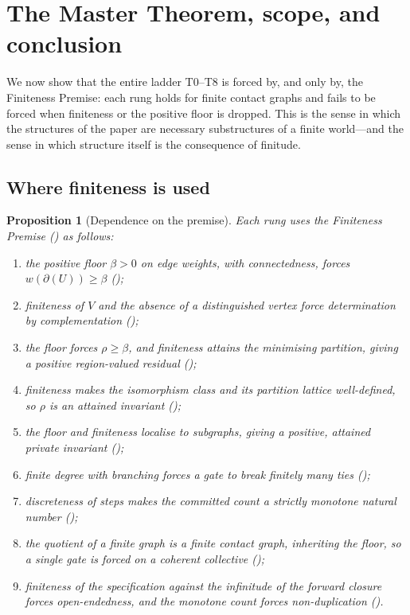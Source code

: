 \documentclass[11pt,a4paper]{article}
\theoremstyle{thmstyle}
\newtheorem{proposition}[theorem]{Proposition}
\theoremstyle{definition}
\theoremstyle{remark}
\newcommand{\V}{V}                        %
\newcommand{\wt}{w}                       %
\newcommand{\floorc}{\beta}               %
\newcommand{\cut}{\partial}               %
\newcommand{\Res}{\rho}                   %
\begin{document}
\section{The Master Theorem, scope, and conclusion}
\label{sec:master}

We now show that the entire ladder T0--T8 is forced by, and only by, the
Finiteness Premise: each rung holds for finite contact graphs and fails to be
forced when finiteness or the positive floor is dropped. This is the sense in
which the structures of the paper are necessary substructures of a finite
world---and the sense in which structure itself is the consequence of finitude.

\subsection{Where finiteness is used}

\begin{proposition}[Dependence on the premise]
\label{prop:dependence}
Each rung uses the Finiteness Premise \textup{(}\textup{)} as
follows:
\begin{enumerate}[label=\textup{(T\arabic*)},leftmargin=3em,start=0]
\item the positive floor $\floorc>0$ on edge weights, with connectedness, forces
$\wt(\cut(U))\ge\floorc$ \textup{(}\textup{)};
\item finiteness of $\V$ and the absence of a distinguished vertex force
determination by complementation \textup{(}\textup{)};
\item the floor forces $\Res\ge\floorc$, and finiteness attains the minimising
partition, giving a positive region-valued residual
\textup{(}\textup{)};
\item finiteness makes the isomorphism class and its partition lattice
well-defined, so $\Res$ is an attained invariant
\textup{(}\textup{)};
\item the floor and finiteness localise to subgraphs, giving a positive,
attained private invariant \textup{(}\textup{)};
\item finite degree with branching forces a gate to break finitely many ties
\textup{(}\textup{)};
\item discreteness of steps makes the committed count a strictly monotone natural
number \textup{(}\textup{)};
\item the quotient of a finite graph is a finite contact graph, inheriting the
floor, so a single gate is forced on a coherent collective
\textup{(}\textup{)};
\item finiteness of the specification against the infinitude of the forward
closure forces open-endedness, and the monotone count forces non-duplication
\textup{(}\textup{)}.
\end{enumerate}
\end{proposition}
\end{document}
